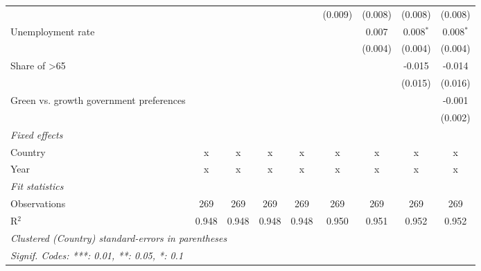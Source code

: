 \begin{table}[htbp]
\begin{tabular}{lcccccccc}
                                                               &              &              &         &         & (0.009)     & (0.008) & (0.008)     & (0.008)\\   
      Unemployment rate                                        &              &              &         &         &             & 0.007   & 0.008$^{*}$ & 0.008$^{*}$\\   
                                                               &              &              &         &         &             & (0.004) & (0.004)     & (0.004)\\   
      Share of >65                                             &              &              &         &         &             &         & -0.015      & -0.014\\   
                                                               &              &              &         &         &             &         & (0.015)     & (0.016)\\   
      Green vs. growth government preferences                  &              &              &         &         &             &         &             & -0.001\\   
                                                               &              &              &         &         &             &         &             & (0.002)\\   
      \emph{Fixed effects}\\
      Country                                                  & x            & x            & x       & x       & x           & x       & x           & x\\  
      Year                                                     & x            & x            & x       & x       & x           & x       & x           & x\\  
      \midrule \emph{Fit statistics}\\
      Observations                                             & 269          & 269          & 269     & 269     & 269         & 269     & 269         & 269\\  
      R$^2$                                                    & 0.948        & 0.948        & 0.948   & 0.948   & 0.950       & 0.951   & 0.952       & 0.952\\  
      \midrule
      \multicolumn{9}{l}{\emph{Clustered (Country) standard-errors in parentheses}}\\
      \multicolumn{9}{l}{\emph{Signif. Codes: ***: 0.01, **: 0.05, *: 0.1}}\\
   \end{tabular}
\end{table}



